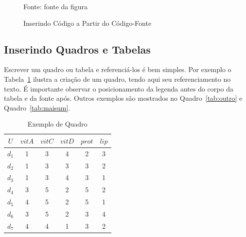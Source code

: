 \begin{figure}[H]
\centering
\caption{Inserindo Código a Partir do Código-Fonte} %
\label{fig:exemplocodigo2} %

{\small Fonte: fonte da figura} %
\end{figure}

\subsection{Inserindo Quadros e Tabelas}

Escrever um quadro ou tabela e referenciá-los é bem simples. Por exemplo o Tabela~\ref{tab:exemplo} ilustra a criação de um quadro, tendo aqui seu referenciamento no texto. É importante observar o posicionamento da legenda antes do corpo da tabela e da fonte após. Outros exemplos são mostrados no Quadro~\ref{tab:outro} e Quadro~\ref{tab:maisum}.

\begin{table}[h!]
  \begin{center}
    \caption{Exemplo de Quadro} 
    \label{tab:exemplo}
    \begin{tabular}{c c c c c c }
      \hline
      $U$ & \multicolumn{1}{|c}{$vitA$} & \multicolumn{1}{|c}{$vitC$} & \multicolumn{1}{|c}{$vitD$} & \multicolumn{1}{|c}{$prot$} & \multicolumn{1}{|c}{$lip$} \\
      \hline
      $d_1$ & 1 & 3 & 4 & 2 & 3\\
      $d_2$ & 1 & 3 & 3 & 3 & 2\\
      $d_3$ & 1 & 3 & 4 & 3 & 1\\
      $d_4$ & 3 & 5 & 2 & 5 & 2\\
      $d_5$ & 4 & 5 & 2 & 5 & 1\\
      $d_6$ & 3 & 5 & 2 & 3 & 4\\
      $d_7$ & 4 & 4 & 1 & 3 & 2\\
      \hline 
    \end{tabular}
  \end{center}
\end{table}

